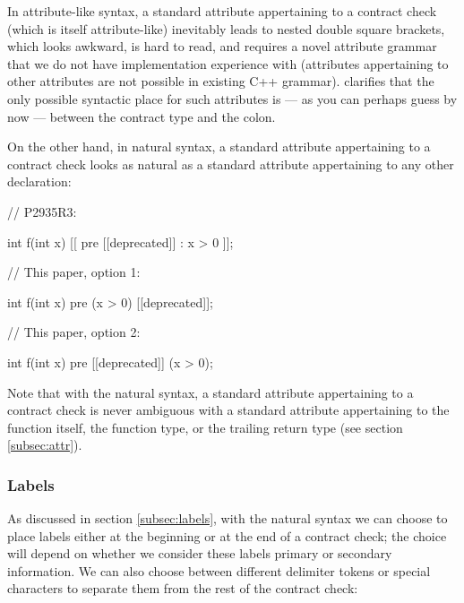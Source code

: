 In attribute-like syntax, a standard attribute appertaining to a contract check (which is itself attribute-like) inevitably leads to nested double square brackets, which looks awkward, is hard to read, and requires a novel attribute grammar that we do not have implementation experience with (attributes appertaining to other attributes are not possible in existing C++ grammar).  \cite{P2935R3} clarifies that the only possible syntactic place for such attributes is --- as you can perhaps guess by now --- between the contract type and the colon.

On the other hand, in natural syntax, a standard attribute appertaining to a contract check looks as natural as a standard attribute appertaining to any other declaration:

\begin{minipage}[t]{8cm}
\begin{codeblock}
// P2935R3:

int f(int x) 
  [[ pre [[deprecated]] : x > 0 ]];
\end{codeblock}
\end{minipage}
\begin{minipage}[t]{8cm}
\begin{codeblock}
// This paper, option 1:

int f(int x) 
  pre (x > 0) [[deprecated]];
  
// This paper, option 2:

int f(int x) 
  pre [[deprecated]] (x > 0);
\end{codeblock}
\end{minipage}

Note that with the natural syntax, a standard attribute appertaining to a contract check is never ambiguous with a standard attribute appertaining to the function itself, the function type, or the trailing return type (see section \ref{subsec:attr}).

\subsubsection{Labels}

As discussed in section \ref{subsec:labels}, with the natural syntax we can choose to place labels either at the beginning or at the end of a contract check; the choice will depend on whether we consider these labels primary or secondary information. We can also choose between different delimiter tokens or special characters to separate them from the rest of the contract check:

